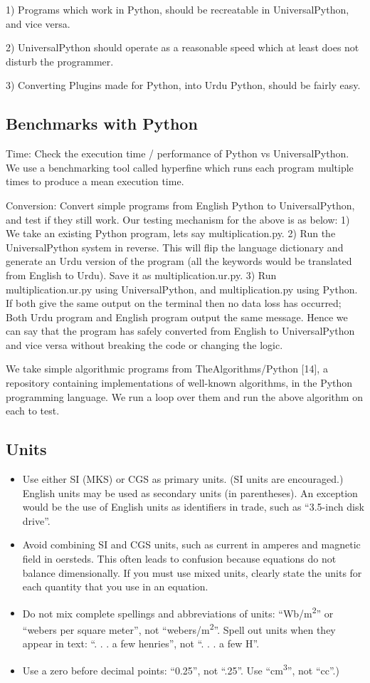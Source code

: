 \documentclass[conference]{IEEEtran}
\begin{document}
1) Programs which work in Python, should be recreatable in UniversalPython, and vice versa.

2) UniversalPython should operate as a reasonable speed which at least does not disturb the programmer.

3) Converting Plugins made for Python, into Urdu
Python, should be fairly easy.

\subsection{Benchmarks with Python}\label{AA}

Time: Check the execution time / performance of Python vs UniversalPython. We use a benchmarking tool called hyperfine which runs each program multiple times to produce a mean execution time.

Conversion: Convert simple programs from English Python to UniversalPython, and test if they still work. Our testing mechanism for the above is as below:
1) We take an existing Python program, lets say multiplication.py.
2) Run the UniversalPython system in reverse. This will flip the language dictionary and generate an Urdu version of the program (all the keywords would be translated from English to Urdu). Save it as multiplication.ur.py.
3) Run multiplication.ur.py using UniversalPython, and multiplication.py using Python. If both give the same output on the terminal then no data loss has occurred; Both Urdu program and English program output the same message. Hence we can say that the program has safely converted from English to UniversalPython and vice versa without breaking the code or changing the logic.

We take simple algorithmic programs from TheAlgorithms/Python [14], a repository containing implementations of well-known algorithms, in the Python programming language. We run a loop over them and run the above algorithm on each to test.

\subsection{Units}
\begin{itemize}
\item Use either SI (MKS) or CGS as primary units. (SI units are encouraged.) English units may be used as secondary units (in parentheses). An exception would be the use of English units as identifiers in trade, such as ``3.5-inch disk drive''.
\item Avoid combining SI and CGS units, such as current in amperes and magnetic field in oersteds. This often leads to confusion because equations do not balance dimensionally. If you must use mixed units, clearly state the units for each quantity that you use in an equation.
\item Do not mix complete spellings and abbreviations of units: ``Wb/m\textsuperscript{2}'' or ``webers per square meter'', not ``webers/m\textsuperscript{2}''. Spell out units when they appear in text: ``. . . a few henries'', not ``. . . a few H''.
\item Use a zero before decimal points: ``0.25'', not ``.25''. Use ``cm\textsuperscript{3}'', not ``cc''.)
\end{itemize}
\end{document}
